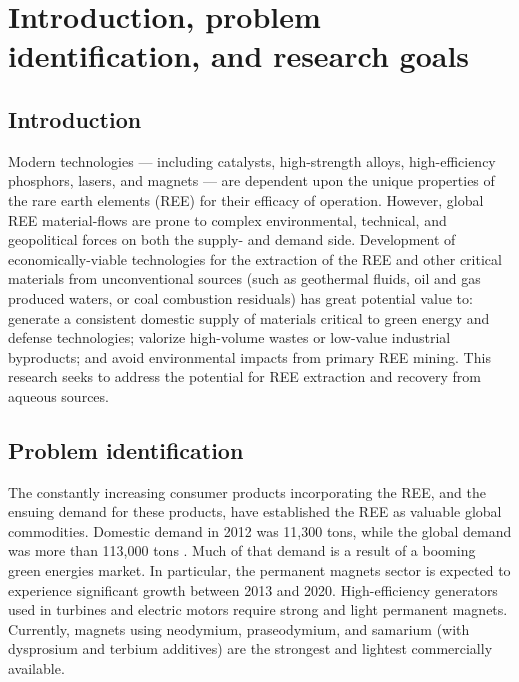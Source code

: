 \chapter{Introduction, problem identification, and research goals}


\section{Introduction}

Modern technologies --- including catalysts, high-strength alloys, high-efficiency phosphors, lasers, and magnets --- are dependent upon the unique properties of the rare earth elements (REE) for their efficacy of operation.
However, global REE material-flows are prone to complex environmental, technical, and geopolitical forces on both the supply- and demand side.
Development of economically-viable technologies for the extraction of the REE and other critical materials from unconventional sources (such as geothermal fluids, oil and gas produced waters, or coal combustion residuals) has great potential value to:
generate a consistent domestic supply of materials critical to green energy and defense technologies;
valorize high-volume wastes or low-value industrial byproducts;
and avoid environmental impacts from primary REE mining.
This research seeks to address the potential for REE extraction and recovery from aqueous sources.

\section{Problem identification}

The constantly increasing consumer products incorporating the REE, and the ensuing demand for these products, have established the REE as valuable global commodities.
Domestic demand in 2012 was 11,300 tons, while the global demand was more than 113,000 tons \citep{FrostSullivan_REEmarket}.
Much of that demand is a result of a booming green energies market.
In particular, the permanent magnets sector is expected to experience significant growth between 2013 and 2020.
High-efficiency generators used in turbines and electric motors require strong and light permanent magnets.
Currently, magnets using neodymium, praseodymium, and samarium (with dysprosium and terbium additives) are the strongest and lightest commercially available.

